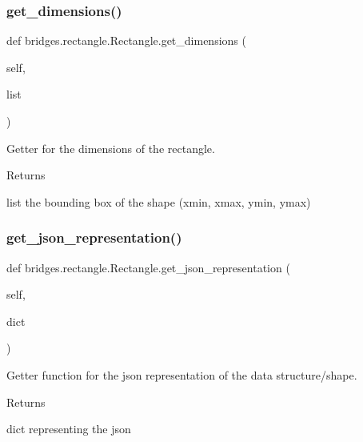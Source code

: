 \subsubsection{\texorpdfstring{get\+\_\+dimensions()}{get\_dimensions()}}
{\footnotesize\ttfamily def bridges.\+rectangle.\+Rectangle.\+get\+\_\+dimensions (\begin{DoxyParamCaption}\item[{}]{self,  }\item[{}]{list }\end{DoxyParamCaption})}



Getter for the dimensions of the rectangle. 

\begin{DoxyReturn}{Returns}


list the bounding box of the shape (xmin, xmax, ymin, ymax) 
\end{DoxyReturn}
\mbox{\label{classbridges_1_1rectangle_1_1_rectangle_abed807aa2b797312357395f874577a64}} 
\subsubsection{\texorpdfstring{get\+\_\+json\+\_\+representation()}{get\_json\_representation()}}
{\footnotesize\ttfamily def bridges.\+rectangle.\+Rectangle.\+get\+\_\+json\+\_\+representation (\begin{DoxyParamCaption}\item[{}]{self,  }\item[{}]{dict }\end{DoxyParamCaption})}



Getter function for the json representation of the data structure/shape. 

\begin{DoxyReturn}{Returns}


dict representing the json 
\end{DoxyReturn}
\mbox{\label{classbridges_1_1rectangle_1_1_rectangle_aad74ee17feb376967249296d34dfcb74}} 
